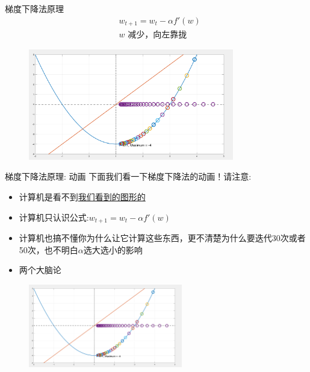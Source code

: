 \documentclass[handout]{ctexbeamer}
\begin{document}
\begin{frame}{梯度下降法原理}
\begin{align*}
	& w_{t+1} = w_t - \alpha f'(w) \\
	& \text{$w$ 减少，向左靠拢}
\end{align*}	
\begin{figure}[H]
	\centering
	\includegraphics[width=0.8\textwidth]{fig/GDani2}
\end{figure}
\end{frame}

\begin{frame}{梯度下降法原理: 动画}
	下面我们看一下梯度下降法的动画！请注意:
	\begin{itemize}
	\setlength\itemsep{0.6em}
		\item 计算机是看不到\underline{我们看到的图形的}
		\item 计算机只认识公式:$w_{t+1} = w_t - \alpha f'(w)$
		\item 计算机也搞不懂你为什么让它计算这些东西，更不清楚为什么要迭代30次或者50次，也不明白$\alpha$选大选小的影响
		\item 两个大脑论
	\end{itemize}
	\begin{figure}[H]
	\centering
	\includegraphics[width=0.6\textwidth]{fig/GDani2}
\end{figure}
\end{frame}
\end{document}

